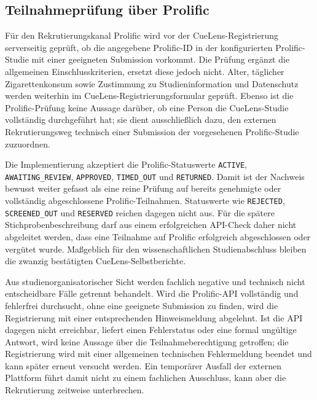 
\begin{neu}
\section{Teilnahmeprüfung über Prolific}

Für den Rekrutierungskanal Prolific wird vor der CueLens-Registrierung serverseitig geprüft, ob die angegebene Prolific-ID in der konfigurierten Prolific-Studie mit einer geeigneten Submission vorkommt. Die Prüfung ergänzt die allgemeinen Einschlusskriterien, ersetzt diese jedoch nicht. Alter, täglicher Zigarettenkonsum sowie Zustimmung zu Studieninformation und Datenschutz werden weiterhin im CueLens-Registrierungsformular geprüft. Ebenso ist die Prolific-Prüfung keine Aussage darüber, ob eine Person die CueLens-Studie vollständig durchgeführt hat; sie dient ausschließlich dazu, den externen Rekrutierungsweg technisch einer Submission der vorgesehenen Prolific-Studie zuzuordnen.

Die Implementierung akzeptiert die Prolific-Statuswerte \texttt{ACTIVE}, \texttt{AWAITING\_REVIEW}, \texttt{APPROVED}, \texttt{TIMED\_OUT} und \texttt{RETURNED}. Damit ist der Nachweis bewusst weiter gefasst als eine reine Prüfung auf bereits genehmigte oder vollständig abgeschlossene Prolific-Teilnahmen. Statuswerte wie \texttt{REJECTED}, \texttt{SCREENED\_OUT} und \texttt{RESERVED} reichen dagegen nicht aus. Für die spätere Stichprobenbeschreibung darf aus einem erfolgreichen API-Check daher nicht abgeleitet werden, dass eine Teilnahme auf Prolific erfolgreich abgeschlossen oder vergütet wurde. Maßgeblich für den wissenschaftlichen Studienabschluss bleiben die zwanzig bestätigten CueLens-Selbstberichte.

Aus studienorganisatorischer Sicht werden fachlich negative und technisch nicht entscheidbare Fälle getrennt behandelt. Wird die Prolific-API vollständig und fehlerfrei durchsucht, ohne eine geeignete Submission zu finden, wird die Registrierung mit einer entsprechenden Hinweismeldung abgelehnt. Ist die API dagegen nicht erreichbar, liefert einen Fehlerstatus oder eine formal ungültige Antwort, wird keine Aussage über die Teilnahmeberechtigung getroffen; die Registrierung wird mit einer allgemeinen technischen Fehlermeldung beendet und kann später erneut versucht werden. Ein temporärer Ausfall der externen Plattform führt damit nicht zu einem fachlichen Ausschluss, kann aber die Rekrutierung zeitweise unterbrechen.


\end{neu}
